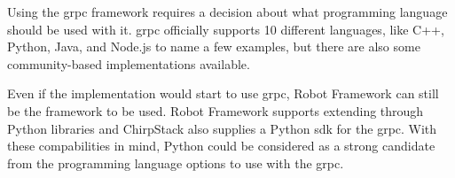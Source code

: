 \clearpage

Using the \gls{grpc} framework requires a decision about what programming language should be used with it.
\gls{grpc} officially supports 10 different languages, like C++, Python, Java, and Node.js to name a few examples, but there are also some community-based implementations available.

Even if the implementation would start to use \gls{grpc}, Robot Framework can still be the framework to be used.
Robot Framework supports extending through Python libraries and ChirpStack also supplies a Python \gls{sdk} for the \gls{grpc}.
With these compabilities in mind, Python could be considered as a strong candidate from the programming language options to use with the \gls{grpc}.

\clearpage %